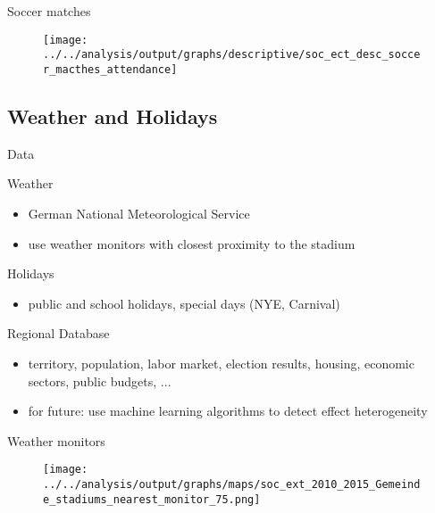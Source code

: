 \documentclass[usenames,dvipsnames]{beamer} %
\begin{document}
	\begin{frame}{Soccer matches}
		\begin{figure}
			\texttt{[image: ../../analysis/output/graphs/descriptive/soc\_ect\_desc\_soccer\_macthes\_attendance]}
		\end{figure}
	\end{frame}

	\subsection{Weather and Holidays}
	\begin{frame}{Data}
		\begin{block}{Weather}
			\begin{itemize}
				\item German National Meteorological Service
				\item use weather monitors with closest proximity to the stadium 
			\end{itemize}
		\end{block}
		\begin{block}{Holidays}
			\begin{itemize}
				\item public and school holidays, special days (NYE, Carnival)
			\end{itemize}	
		\end{block}
		\begin{block}{Regional Database}
			\begin{itemize}
				\item territory, population, labor market, election results, housing, economic sectors, public budgets, ... 
				\item for future: use machine learning algorithms to detect effect heterogeneity
			\end{itemize}
		\end{block}
	\end{frame}

	\begin{frame}{Weather monitors}
		\begin{figure}
			\texttt{[image: ../../analysis/output/graphs/maps/soc\_ext\_2010\_2015\_Gemeinde\_stadiums\_nearest\_monitor\_75.png]}
		\end{figure}
	\end{frame}
\end{document}
